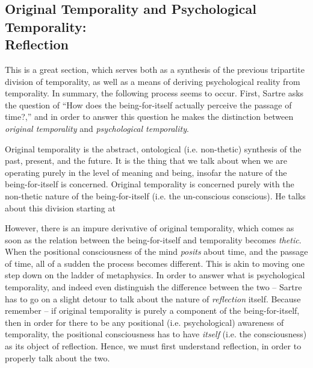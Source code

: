 \subsection{Original Temporality and Psychological Temporality: \\ Reflection}

This is a great section, which serves both as a synthesis of the previous tripartite division of temporality, as well as a means of deriving psychological reality from temporality. In summary, the following process seems to occur. First, Sartre asks the question of \enquote{How does the being-for-itself actually perceive the passage of time?,} and in order to answer this question he makes the distinction between \emph{original temporality} and \emph{psychological temporality}.

Original temporality is the abstract, ontological (i.e. non-thetic) synthesis of the past, present, and the future.
It is the thing that we talk about when we are operating purely in the level of meaning and being, insofar the nature of the being-for-itself is concerned. Original temporality is concerned purely with the non-thetic nature of the being-for-itself (i.e. the un-conscious conscious). He talks about this division starting at \autocite[217]{sartre}

However, there is an impure derivative of original temporality, which comes as soon as the relation between the being-for-itself and temporality becomes \emph{thetic}. When the positional consciousness of the mind \emph{posits} about time, and the passage of time, all of a sudden the process becomes different. This is akin to moving one step down on the ladder of metaphysics. In order to answer what is psychological temporality, and indeed even distinguish the difference between the two -- Sartre has to go on a slight detour to talk about the nature of \emph{reflection} itself. Because remember -- if original temporality is purely a component of the being-for-itself, then in order for there to be any positional (i.e. psychological) awareness of temporality, the positional consciousness has to have \emph{itself} (i.e. the consciousness) as its object of reflection. Hence, we must first understand reflection, in order to properly talk about the two.

